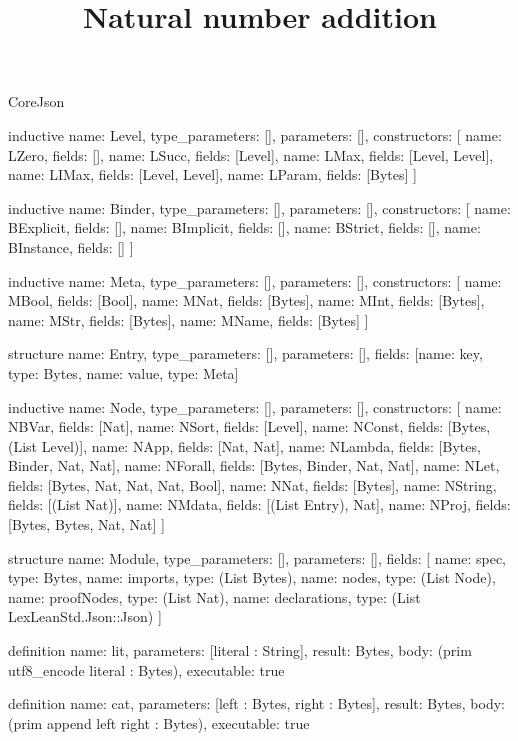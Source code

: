 \begin{lexlean}{CoreJson}
\title{Natural number addition}
\begin{semanticmodule}
inductive{
  name: Level,
  type_parameters: [],
  parameters: [],
  constructors: [
    {name: LZero, fields: []},
    {name: LSucc, fields: [Level]},
    {name: LMax, fields: [Level, Level]},
    {name: LIMax, fields: [Level, Level]},
    {name: LParam, fields: [Bytes]}
  ]
}

inductive{
  name: Binder,
  type_parameters: [],
  parameters: [],
  constructors: [
    {name: BExplicit, fields: []},
    {name: BImplicit, fields: []},
    {name: BStrict, fields: []},
    {name: BInstance, fields: []}
  ]
}

inductive{
  name: Meta,
  type_parameters: [],
  parameters: [],
  constructors: [
    {name: MBool, fields: [Bool]},
    {name: MNat, fields: [Bytes]},
    {name: MInt, fields: [Bytes]},
    {name: MStr, fields: [Bytes]},
    {name: MName, fields: [Bytes]}
  ]
}

structure{
  name: Entry,
  type_parameters: [],
  parameters: [],
  fields: [{name: key, type: Bytes}, {name: value, type: Meta}]
}

inductive{
  name: Node,
  type_parameters: [],
  parameters: [],
  constructors: [
    {name: NBVar, fields: [Nat]},
    {name: NSort, fields: [Level]},
    {name: NConst, fields: [Bytes, (List Level)]},
    {name: NApp, fields: [Nat, Nat]},
    {name: NLambda, fields: [Bytes, Binder, Nat, Nat]},
    {name: NForall, fields: [Bytes, Binder, Nat, Nat]},
    {name: NLet, fields: [Bytes, Nat, Nat, Nat, Bool]},
    {name: NNat, fields: [Bytes]},
    {name: NString, fields: [(List Nat)]},
    {name: NMdata, fields: [(List Entry), Nat]},
    {name: NProj, fields: [Bytes, Bytes, Nat, Nat]}
  ]
}

structure{
  name: Module,
  type_parameters: [],
  parameters: [],
  fields: [
    {name: spec, type: Bytes},
    {name: imports, type: (List Bytes)},
    {name: nodes, type: (List Node)},
    {name: proofNodes, type: (List Nat)},
    {name: declarations, type: (List LexLeanStd.Json::Json)}
  ]
}

definition{
  name: lit,
  parameters: [literal : String],
  result: Bytes,
  body: (prim utf8_encode literal : Bytes),
  executable: true
}

definition{
  name: cat,
  parameters: [left : Bytes, right : Bytes],
  result: Bytes,
  body: (prim append left right : Bytes),
  executable: true
}


\end{semanticmodule}
\end{lexlean}
